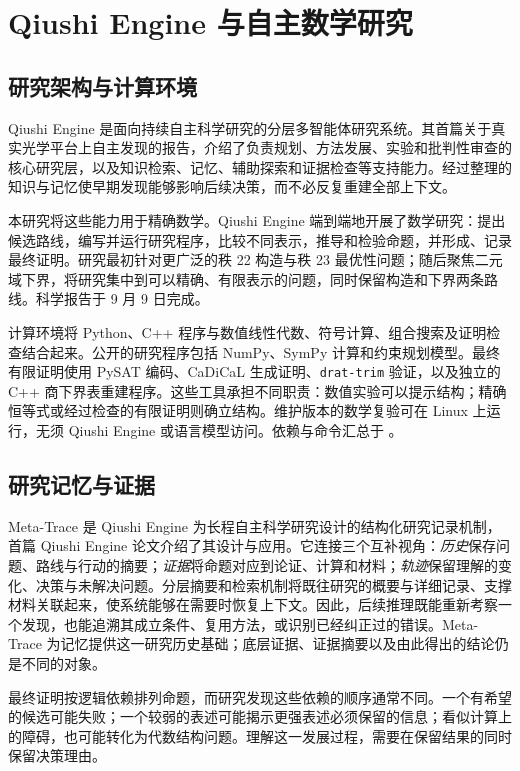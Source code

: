 \section{Qiushi Engine 与自主数学研究}\label{sec:research}

\subsection{研究架构与计算环境}

Qiushi Engine 是面向持续自主科学研究的分层多智能体研究系统。其首篇关于真实光学平台上自主发现的报告，介绍了负责规划、方法发展、实验和批判性审查的核心研究层，以及知识检索、记忆、辅助探索和证据检查等支持能力\cite{yang2026optical}。经过整理的知识与记忆使早期发现能够影响后续决策，而不必反复重建全部上下文。

本研究将这些能力用于精确数学。Qiushi Engine 端到端地开展了数学研究：提出候选路线，编写并运行研究程序，比较不同表示，推导和检验命题，并形成、记录最终证明。研究最初针对更广泛的秩 22 构造与秩 23 最优性问题；随后聚焦二元域下界，将研究集中到可以精确、有限表示的问题，同时保留构造和下界两条路线。科学报告于 9 月 9 日完成。

计算环境将 Python、C++ 程序与数值线性代数、符号计算、组合搜索及证明检查结合起来。公开的研究程序包括 NumPy、SymPy 计算和约束规划模型。最终有限证明使用 PySAT 编码、CaDiCaL 生成证明、\texttt{drat-trim} 验证，以及独立的 C++ 商下界表重建程序。这些工具承担不同职责：数值实验可以提示结构；精确恒等式或经过检查的有限证明则确立结构。维护版本的数学复验可在 Linux 上运行，无须 Qiushi Engine 或语言模型访问。依赖与命令汇总于 。

\subsection{研究记忆与证据}

Meta-Trace 是 Qiushi Engine 为长程自主科学研究设计的结构化研究记录机制，首篇 Qiushi Engine 论文介绍了其设计与应用\cite{yang2026optical}。它连接三个互补视角：\emph{历史}保存问题、路线与行动的摘要；\emph{证据}将命题对应到论证、计算和材料；\emph{轨迹}保留理解的变化、决策与未解决问题。分层摘要和检索机制将既往研究的概要与详细记录、支撑材料关联起来，使系统能够在需要时恢复上下文。因此，后续推理既能重新考察一个发现，也能追溯其成立条件、复用方法，或识别已经纠正过的错误。Meta-Trace 为记忆提供这一研究历史基础；底层证据、证据摘要以及由此得出的结论仍是不同的对象。

最终证明按逻辑依赖排列命题，而研究发现这些依赖的顺序通常不同。一个有希望的候选可能失败；一个较弱的表述可能揭示更强表述必须保留的信息；看似计算上的障碍，也可能转化为代数结构问题。理解这一发展过程，需要在保留结果的同时保留决策理由。

